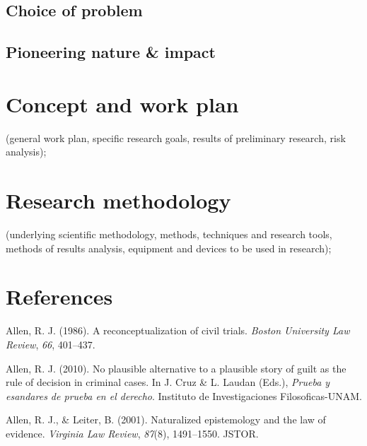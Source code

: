 \documentclass[11pt,dvipsnames,enabledeprecatedfontcommands]{scrartcl}
\begin{document}

\hypertarget{choice-of-problem}{%
\subsection{Choice of problem}\label{choice-of-problem}}

\hypertarget{pioneering-nature-impact}{%
\subsection{Pioneering nature \&
impact}\label{pioneering-nature-impact}}

\hypertarget{concept-and-work-plan}{%
\section{Concept and work plan}\label{concept-and-work-plan}}

(general work plan, specific research goals, results of preliminary
research, risk analysis);

\hypertarget{research-methodology}{%
\section{Research methodology}\label{research-methodology}}

(underlying scientific methodology, methods, techniques and research
tools, methods of results analysis, equipment and devices to be used in
research);

\hypertarget{references}{%
\section*{References}\label{references}}

\hypertarget{refs}{}
\leavevmode\hypertarget{ref-Allen1986A-Reconceptuali}{}%
Allen, R. J. (1986). A reconceptualization of civil trials. \emph{Boston
University Law Review}, \emph{66}, 401--437.

\leavevmode\hypertarget{ref-Allen2010No-Plausible-Al}{}%
Allen, R. J. (2010). No plausible alternative to a plausible story of
guilt as the rule of decision in criminal cases. In J. Cruz \& L. Laudan
(Eds.), \emph{Prueba y esandares de prueba en el derecho}. Instituto de
Investigaciones Filosoficas-UNAM.

\leavevmode\hypertarget{ref-allen2001naturalized}{}%
Allen, R. J., \& Leiter, B. (2001). Naturalized epistemology and the law
of evidence. \emph{Virginia Law Review}, \emph{87}(8), 1491--1550.
JSTOR.
\end{document}
